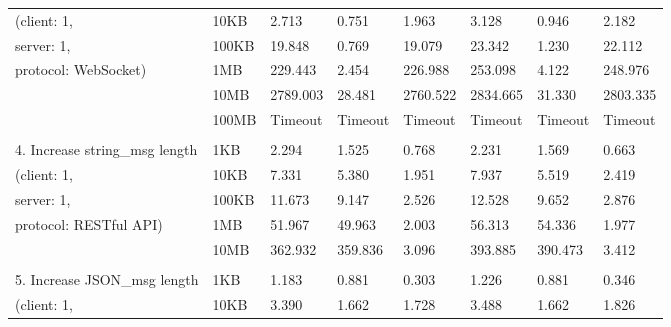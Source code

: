 \begin{table}[htbp]
\begin{tabular}{m{} m{} m{} m{} m{} m{} m{} m{}}
    (client: 1,                      & 10KB       & 2.713             & 0.751    & 1.963                   & 3.128             & 0.946    & 2.182                   \\
    server: 1,                       & 100KB      & 19.848            & 0.769    & 19.079                  & 23.342            & 1.230    & 22.112                  \\
    protocol: WebSocket)             & 1MB        & 229.443           & 2.454    & 226.988                 & 253.098           & 4.122    & 248.976                 \\
                                     & 10MB       & 2789.003          & 28.481   & 2760.522                & 2834.665          & 31.330   & 2803.335                \\
                                     & 100MB      & Timeout           & Timeout  & Timeout                 & Timeout           & Timeout  & Timeout                 \\
    & & & & & & &\\
    4. Increase string\_msg length   &  1KB       & 2.294             & 1.525    & 0.768                   & 2.231             & 1.569    & 0.663                   \\
    (client: 1,                      &  10KB      & 7.331             & 5.380    & 1.951                   & 7.937             & 5.519    & 2.419                   \\
    server: 1,                       &  100KB     & 11.673            & 9.147    & 2.526                   & 12.528            & 9.652    & 2.876                   \\
    protocol: RESTful API)           &  1MB       & 51.967            & 49.963   & 2.003                   & 56.313            & 54.336   & 1.977                   \\
                                     &  10MB      & 362.932           & 359.836  & 3.096                   & 393.885           & 390.473  & 3.412                   \\
    & & & & & & &\\
    5. Increase JSON\_msg length     & 1KB        & 1.183             & 0.881    & 0.303                   & 1.226             & 0.881    & 0.346                   \\
    (client: 1,                      & 10KB       & 3.390             & 1.662    & 1.728                   & 3.488             & 1.662    & 1.826                   \\

\end{tabular}
\end{table}
